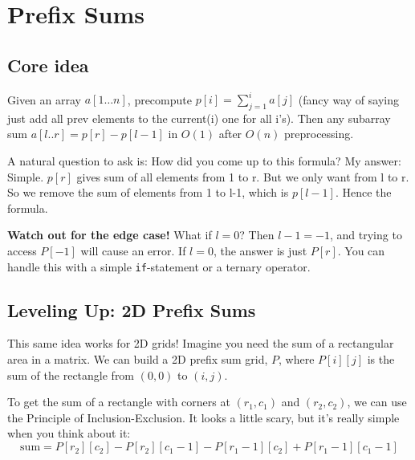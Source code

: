 \chapter{Prefix Sums}
\label{ch:prefix-sums}


\section{Core idea}
Given an array $a[1\ldots n]$, precompute $p[i]=\sum_{j=1}^i a[j]$ (fancy way of saying just add all prev elements to the current(i) one for all i's). Then any subarray sum $a[l..r] = p[r]-p[l-1]$ in $O(1)$ after $O(n)$ preprocessing.


A natural question to ask is: How did you come up to this formula?
My answer: Simple. $p[r]$ gives sum of all elements from 1 to r. But we only want from l to r. So we remove the sum of elements from 1 to l-1, which is $p[l-1]$. Hence the formula.




\textbf{Watch out for the edge case!} What if $l=0$? Then $l-1=-1$, and trying to access $P[-1]$ will cause an error.  
If $l=0$, the answer is just $P[r]$. You can handle this with a simple \texttt{if}-statement or a ternary operator.  

\section{Leveling Up: 2D Prefix Sums}
This same idea works for 2D grids! Imagine you need the sum of a rectangular area in a matrix.  
We can build a 2D prefix sum grid, $P$, where $P[i][j]$ is the sum of the rectangle from $(0,0)$ to $(i,j)$.  

To get the sum of a rectangle with corners at $(r_1, c_1)$ and $(r_2, c_2)$, we can use the Principle of Inclusion-Exclusion. It looks a little scary, but it's really simple when you think about it:
\[
\text{sum} = P[r_2][c_2] - P[r_2][c_1-1] - P[r_1-1][c_2] + P[r_1-1][c_1-1]
\]

